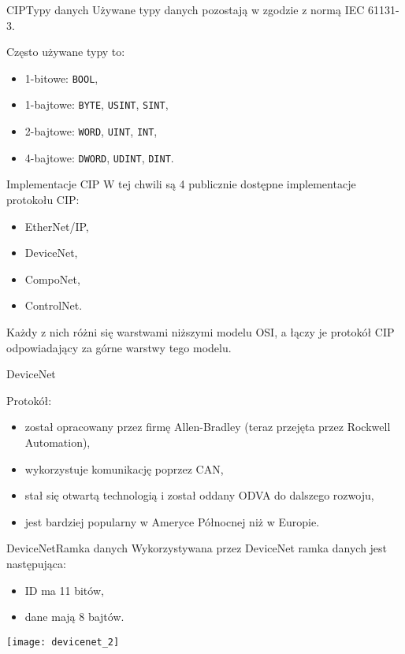 \documentclass[11pt]{beamer}
\begin{document}
\begin{frame}{CIP}{Typy danych}
Używane typy danych pozostają w zgodzie z normą IEC 61131-3.

Często używane typy to:
\begin{itemize}
\item 1-bitowe: \texttt{BOOL},
\item 1-bajtowe: \texttt{BYTE}, \texttt{USINT}, \texttt{SINT},
\item 2-bajtowe: \texttt{WORD}, \texttt{UINT}, \texttt{INT},
\item 4-bajtowe: \texttt{DWORD}, \texttt{UDINT}, \texttt{DINT}.
\end{itemize}
\end{frame}



\begin{frame}{Implementacje CIP}
W tej chwili są 4 publicznie dostępne implementacje protokołu CIP:
\begin{itemize}
\item EtherNet/IP,
\item DeviceNet,
\item CompoNet,
\item ControlNet.
\end{itemize}

\medskip

Każdy z nich różni się warstwami niższymi modelu OSI, a łączy je protokół CIP odpowiadający za górne warstwy tego modelu.
\end{frame}

\begin{frame}{DeviceNet}

Protokół:
\begin{itemize}
\item został opracowany przez firmę Allen-Bradley (teraz przejęta przez Rockwell Automation),
\item wykorzystuje komunikację poprzez CAN,
\item stał się otwartą technologią i został oddany ODVA do dalszego rozwoju,
\item jest bardziej popularny w Ameryce Północnej niż w Europie.
\end{itemize}
\end{frame}


\begin{frame}{DeviceNet}{Ramka danych}
Wykorzystywana przez DeviceNet ramka danych jest następująca:
\begin{itemize}
\item ID ma 11 bitów,
\item dane mają 8 bajtów.
\end{itemize}

\medskip

\begin{center}
	\texttt{[image: devicenet\_2]}
\end{center}
\end{frame}
\end{document}
